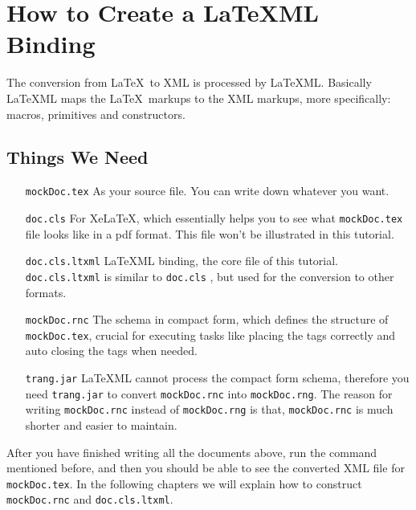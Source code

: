 \documentclass[a4paper]{article}
\begin{document}
\section{How to Create a LaTeXML Binding}
The conversion from \LaTeX\ to XML is processed by \LaTeX ML. Basically \LaTeX ML maps the \LaTeX\ markups to the XML markups, more specifically: macros, primitives and constructors. 
\subsection{Things We Need}
\begin{itemize}
\item[\texttt{mockDoc.tex}] As your source file. You can write down whatever you want.\\

\item[\texttt{doc.cls}] For Xe\LaTeX, which essentially helps you to see what \texttt{mockDoc.tex} file looks like in a pdf format. This file won't be illustrated in this tutorial.\\ 

\item[\texttt{doc.cls.ltxml}] \LaTeX ML binding, the core file of this tutorial. \texttt{doc.cls.ltxml} is similar to \texttt{doc.cls} , but used for the conversion to other formats. \\

\item[\texttt{mockDoc.rnc}] The schema in compact form, which defines the structure of \texttt{mockDoc.tex}, crucial for executing tasks like placing the tags correctly and auto closing the tags when needed. \\

\item[\texttt{trang.jar}] \LaTeX ML cannot process the compact form schema, therefore you need \texttt{trang.jar} to convert \texttt{mockDoc.rnc} into \texttt{mockDoc.rng}. The reason for writing \texttt{mockDoc.rnc} instead of \texttt{mockDoc.rng} is that, \texttt{mockDoc.rnc} is much shorter and easier to maintain. 
\end{itemize}

\noindent After you have finished writing all the documents above, run the command mentioned before, and then you should be able to see the converted XML file for \texttt{mockDoc.tex}. In the following chapters we will explain how to construct \texttt{mockDoc.rnc} and \texttt{doc.cls.ltxml}.
\end{document}
